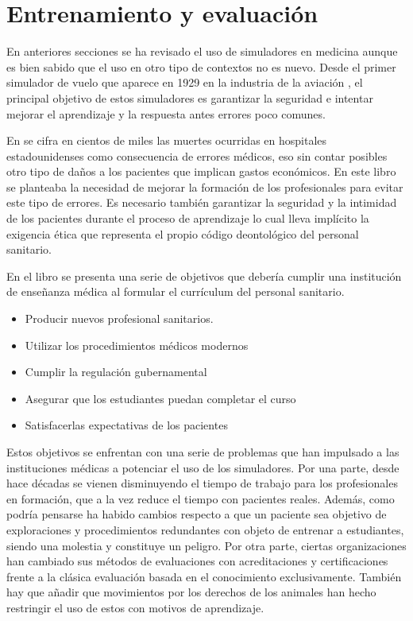 \section{Entrenamiento y evaluación}
\label{art:learning}


En anteriores secciones se ha revisado el uso de simuladores en medicina aunque es bien sabido que el uso en otro tipo de contextos no es nuevo. Desde el primer simulador de vuelo que aparece en 1929 en la industria de la aviación \cite{page2000brief}, el principal objetivo de estos simuladores es garantizar la seguridad e intentar mejorar el aprendizaje y la respuesta antes errores poco comunes.

En \cite{donaldson2000err} se cifra en cientos de miles las muertes ocurridas en hospitales estadounidenses como consecuencia de errores médicos, eso sin contar posibles otro tipo de daños a los pacientes que implican gastos económicos. En este libro se planteaba la necesidad de mejorar la formación de los profesionales para evitar este tipo de errores. 
Es necesario también garantizar la seguridad y la intimidad de los pacientes durante el proceso de aprendizaje lo cual lleva implícito la exigencia ética que representa el propio código deontológico del personal sanitario. 

En el libro \cite{dent2017practical} se presenta una serie de objetivos que debería cumplir una institución de enseñanza médica al formular el currículum del personal sanitario.
\begin{itemize}
    \item Producir nuevos profesional sanitarios.
    \item Utilizar los procedimientos médicos modernos
    \item Cumplir la regulación gubernamental
    \item Asegurar que los estudiantes puedan completar el curso
    \item Satisfacerlas expectativas de los pacientes
\end{itemize}

Estos objetivos se enfrentan con una serie de problemas que han impulsado a las instituciones médicas a potenciar el uso de los simuladores.
Por una parte,  desde hace décadas se vienen disminuyendo el tiempo de trabajo para los profesionales en formación, que a la vez reduce el tiempo con pacientes reales. Además, como podría pensarse ha habido cambios respecto a que un paciente sea objetivo de exploraciones y procedimientos redundantes con objeto de entrenar a estudiantes, siendo una molestia y constituye un peligro. Por otra parte, ciertas organizaciones han cambiado sus métodos de evaluaciones con acreditaciones y certificaciones frente a la clásica evaluación basada en el conocimiento exclusivamente.  También hay que añadir que movimientos por los derechos de los animales han hecho restringir el uso de estos con motivos de aprendizaje.

